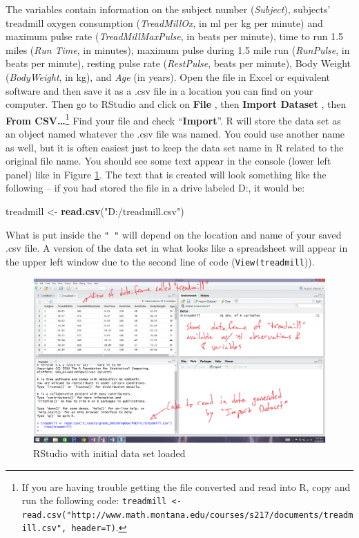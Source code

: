 \documentclass[]{book}
\newenvironment{Shaded}{\begin{snugshade}}{\end{snugshade}}
\newcommand{\KeywordTok}[1]{\textcolor[rgb]{0.13,0.29,0.53}{\textbf{{#1}}}}
\newcommand{\StringTok}[1]{\textcolor[rgb]{0.31,0.60,0.02}{{#1}}}
\newcommand{\NormalTok}[1]{{#1}}
\let\rmarkdownfootnote\footnote%
\def\footnote{\protect\rmarkdownfootnote}
\begin{document}
The variables contain information on the subject number
(\emph{Subject}), subjects' treadmill oxygen consumption
(\emph{TreadMillOx}, in ml per kg per minute) and maximum pulse rate
(\emph{TreadMillMaxPulse}, in beats per minute), time to run 1.5 miles
(\emph{Run Time}, in minutes), maximum pulse during 1.5 mile run
(\emph{RunPulse}, in beats per minute), resting pulse rate
(\emph{RestPulse}, beats per minute), Body Weight (\emph{BodyWeight}, in
kg), and \emph{Age} (in years). Open the file in Excel or equivalent
software and then save it as a .csv file in a location you can find on
your computer. Then go to RStudio and click on \textbf{File} , then
\textbf{Import Dataset} , then \textbf{From CSV\ldots{}}\footnote{If you
  are having trouble getting the file converted and read into R, copy
  and run the following code:
  \texttt{treadmill\ \textless{}-read.csv("http://www.math.montana.edu/courses/s217/documents/treadmill.csv",\ header=T)}.}
Find your file and check ``\textbf{Import}''. R will store the data set
as an object named whatever the .csv file was named. You could use
another name as well, but it is often easiest just to keep the data set
name in R related to the original file name. You should see some text
appear in the console (lower left panel) like in Figure
\ref{fig:Figure3}. The text that is created will look something like the
following -- if you had stored the file in a drive labeled D:, it would
be:

\begin{Shaded}
\begin{Highlighting}[]
\NormalTok{treadmill <-}\StringTok{ }\KeywordTok{read.csv}\NormalTok{(}\StringTok{"D:/treadmill.csv"}\NormalTok{)}
\end{Highlighting}
\end{Shaded}

What is put inside the \texttt{"\ "} will depend on the location and
name of your saved .csv file. A version of the data set in what looks
like a spreadsheet will appear in the upper left window due to the
second line of code (\texttt{View(treadmill})).



\begin{figure}
\includegraphics[width=14.72in]{chapter0_files/image005} \caption{RStudio with initial data set loaded}\label{fig:Figure3}
\end{figure}
\end{document}
